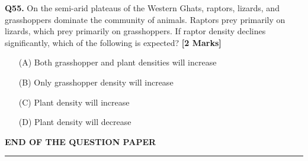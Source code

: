 \documentclass[11pt]{article}
\newcommand{\questionb}[2]{
    \noindent\textbf{Q#2.} #1 \hfill \textbf{[2 Marks]}
}
\begin{document}
\questionb{On the semi-arid plateaus of the Western Ghats, raptors, lizards, and grasshoppers dominate the community of animals. Raptors prey primarily on lizards, which prey primarily on grasshoppers. If raptor density declines significantly, which of the following is expected?}{55}
\begin{enumerate}
    \item[(A)] Both grasshopper and plant densities will increase  
    \item[(B)] Only grasshopper density will increase  
    \item[(C)] Plant density will increase  
    \item[(D)] Plant density will decrease  
\end{enumerate}
\vspace{0.5cm}

\vspace{0.5cm}
\begin{center}
\textbf{END OF THE QUESTION PAPER} \\
\rule{\textwidth}{0.5pt}
\end{center}
\end{document}
